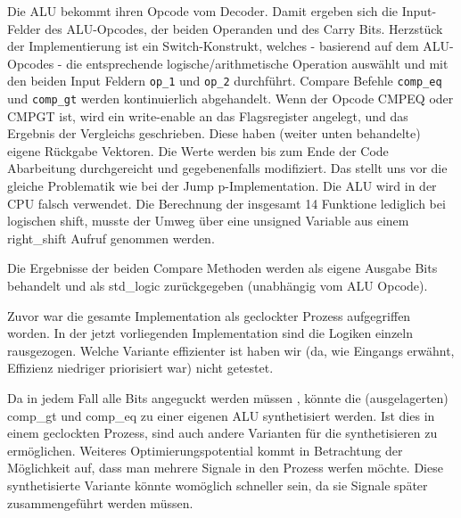 \documentclass[paper=a4,fontsize=12pt,twocolumn]{scrreprt}
\begin{document}
Die ALU bekommt ihren Opcode vom Decoder. Damit ergeben sich die Input-Felder des ALU-Opcodes, der beiden Operanden und des Carry Bits.
Herzstück der Implementierung ist ein Switch-Konstrukt, welches - basierend auf dem ALU-Opcodes - die entsprechende logische/arithmetische Operation auswählt und mit den beiden Input Feldern \texttt{op\_1} und \texttt{op\_2} durchführt.
Compare Befehle \texttt{comp\_eq} und \texttt{comp\_gt} werden kontinuierlich abgehandelt. Wenn der Opcode CMPEQ oder CMPGT ist, wird ein write-enable an das Flagsregister angelegt, und das Ergebnis der Vergleichs geschrieben. Diese haben (weiter unten behandelte) eigene Rückgabe Vektoren.
Die Werte werden bis zum Ende der Code Abarbeitung durchgereicht und gegebenenfalls modifiziert.
Das stellt uns vor die gleiche Problematik wie bei der Jump
p-Implementation. Die ALU wird in der CPU falsch verwendet.
Die Berechnung der insgesamt 14 Funktione lediglich bei logischen shift, musste der Umweg über eine unsigned Variable aus einem right\_shift Aufruf genommen werden. 

Die Ergebnisse der beiden Compare Methoden werden als eigene Ausgabe Bits behandelt und als std\_logic zurückgegeben (unabhängig vom ALU Opcode).










Zuvor war die gesamte Implementation als geclockter Prozess aufgegriffen worden. In der jetzt vorliegenden Implementation sind die Logiken einzeln rausgezogen. Welche Variante effizienter ist haben wir (da, wie Eingangs erwähnt, Effizienz niedriger priorisiert war) nicht getestet.

Da in jedem Fall alle Bits angeguckt werden müssen , könnte die (ausgelagerten) comp\_gt und comp\_eq zu einer eigenen ALU synthetisiert werden. Ist dies in einem geclockten Prozess, sind auch andere Varianten für die synthetisieren zu ermöglichen.
Weiteres Optimierungspotential kommt in Betrachtung der Möglichkeit auf, dass man mehrere Signale in den Prozess werfen möchte. Diese synthetisierte Variante könnte womöglich schneller sein, da sie Signale später zusammengeführt werden müssen.
\end{document}
